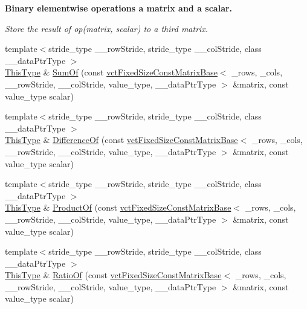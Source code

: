 \begin{Indent}{\bf Binary elementwise operations a matrix and a scalar.}\par
{\em Store the result of op(matrix, scalar) to a third matrix. }\begin{DoxyCompactItemize}
\item 
{\footnotesize template$<$stride\+\_\+type \+\_\+\+\_\+row\+Stride, stride\+\_\+type \+\_\+\+\_\+col\+Stride, class \+\_\+\+\_\+data\+Ptr\+Type $>$ }\\\hyperlink{classvct_fixed_size_const_matrix_base_a7ec66a96ed7e08ce9ff54093133c9d8d}{This\+Type} \& \hyperlink{classvct_fixed_size_matrix_base_a8229148f8d967fb2e396bb8b33b8d149}{Sum\+Of} (const \hyperlink{classvct_fixed_size_const_matrix_base}{vct\+Fixed\+Size\+Const\+Matrix\+Base}$<$ \+\_\+rows, \+\_\+cols, \+\_\+\+\_\+row\+Stride, \+\_\+\+\_\+col\+Stride, value\+\_\+type, \+\_\+\+\_\+data\+Ptr\+Type $>$ \&matrix, const value\+\_\+type scalar)
\item 
{\footnotesize template$<$stride\+\_\+type \+\_\+\+\_\+row\+Stride, stride\+\_\+type \+\_\+\+\_\+col\+Stride, class \+\_\+\+\_\+data\+Ptr\+Type $>$ }\\\hyperlink{classvct_fixed_size_const_matrix_base_a7ec66a96ed7e08ce9ff54093133c9d8d}{This\+Type} \& \hyperlink{classvct_fixed_size_matrix_base_a0e881648fac52ed800c099367ab7d031}{Difference\+Of} (const \hyperlink{classvct_fixed_size_const_matrix_base}{vct\+Fixed\+Size\+Const\+Matrix\+Base}$<$ \+\_\+rows, \+\_\+cols, \+\_\+\+\_\+row\+Stride, \+\_\+\+\_\+col\+Stride, value\+\_\+type, \+\_\+\+\_\+data\+Ptr\+Type $>$ \&matrix, const value\+\_\+type scalar)
\item 
{\footnotesize template$<$stride\+\_\+type \+\_\+\+\_\+row\+Stride, stride\+\_\+type \+\_\+\+\_\+col\+Stride, class \+\_\+\+\_\+data\+Ptr\+Type $>$ }\\\hyperlink{classvct_fixed_size_const_matrix_base_a7ec66a96ed7e08ce9ff54093133c9d8d}{This\+Type} \& \hyperlink{classvct_fixed_size_matrix_base_a734b398eaad70f34aff4bf2df23804e8}{Product\+Of} (const \hyperlink{classvct_fixed_size_const_matrix_base}{vct\+Fixed\+Size\+Const\+Matrix\+Base}$<$ \+\_\+rows, \+\_\+cols, \+\_\+\+\_\+row\+Stride, \+\_\+\+\_\+col\+Stride, value\+\_\+type, \+\_\+\+\_\+data\+Ptr\+Type $>$ \&matrix, const value\+\_\+type scalar)
\item 
{\footnotesize template$<$stride\+\_\+type \+\_\+\+\_\+row\+Stride, stride\+\_\+type \+\_\+\+\_\+col\+Stride, class \+\_\+\+\_\+data\+Ptr\+Type $>$ }\\\hyperlink{classvct_fixed_size_const_matrix_base_a7ec66a96ed7e08ce9ff54093133c9d8d}{This\+Type} \& \hyperlink{classvct_fixed_size_matrix_base_a092aaf18830579524f0d8cc4aabad89f}{Ratio\+Of} (const \hyperlink{classvct_fixed_size_const_matrix_base}{vct\+Fixed\+Size\+Const\+Matrix\+Base}$<$ \+\_\+rows, \+\_\+cols, \+\_\+\+\_\+row\+Stride, \+\_\+\+\_\+col\+Stride, value\+\_\+type, \+\_\+\+\_\+data\+Ptr\+Type $>$ \&matrix, const value\+\_\+type scalar)

\end{DoxyCompactItemize}
\end{Indent}
